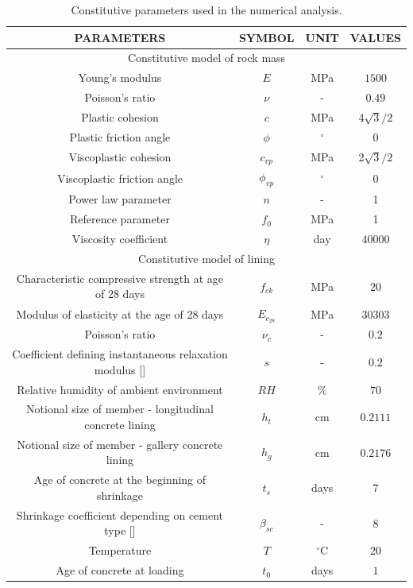 \documentclass[a4paper,fleqn]{cas-sc}
\begin{document}
\FloatBarrier
\begin{table}[h!]
	\caption{Constitutive parameters used in the numerical analysis.}
	\label{table2}
	\centering
	\renewcommand{\arraystretch}{1.25}
	\begin{tabular}{c c c c}
		\hline
		\multicolumn{1}{c}{PARAMETERS} &
		\multicolumn{1}{c}{SYMBOL} &
		\multicolumn{1}{c}{UNIT} &
		\multicolumn{1}{c}{VALUES} \\
		\hline
		\multicolumn{4}{c}{Constitutive model of rock mass} \\
		\hline
		Young's modulus & $E$ & MPa & $1500$ \\
		Poisson's ratio & $\nu$ & - & $0.49$ \\
		Plastic cohesion & $c$ & MPa & 4$\sqrt{3}/2$ \\
		Plastic friction angle & $\phi$ & $^{\circ}$ & 0 \\
		Viscoplastic cohesion & $c_{vp}$ & MPa & 2$\sqrt{3}/2$ \\
		Viscoplastic friction angle & $\phi_{vp}$ & $^{\circ}$ & 0 \\
		Power law parameter & $n$ & - & 1 \\
		Reference parameter & $f_0$ & MPa & 1 \\
		Viscosity coefficient & $\eta$ & day & $40000$ \\
		\hline
		\multicolumn{4}{c}{Constitutive model of lining} \\
		\hline
		
		Characteristic compressive strength at age of 28 days & $f_{ck}$ & MPa & $20$ \\
		Modulus of elasticity at the age of 28 days & $E_{c_{28}}$ & MPa & $30303$ \\
		Poisson's ratio & $\nu_c$ & - & $0.2$ \\
		
		Coefficient defining instantaneous relaxation modulus [\citenum{CEB:1993}] & $s$ & - & $0.2$ \\
		Relative humidity of ambient environment & $RH$ & \% & $70$ \\
		Notional size of member - longitudinal concrete lining & $h_t$ & cm & $0.2111$ \\
		Notional size of member - gallery concrete lining & $h_{g}$ & cm & $0.2176$ \\
		Age of concrete at the beginning of shrinkage & $t_s$ & days & $7$ \\
		Shrinkage coefficient depending on cement type [\citenum{CEB:1993}] & $\beta_{sc}$ & - & $8$ \\
		Temperature & $T$ & $^\circ$C & $20$ \\
		Age of concrete at loading & $t_0$ & days & $1$ \\
		\hline
	\end{tabular}
	\normalsize
\end{table}
\FloatBarrier
\end{document}

